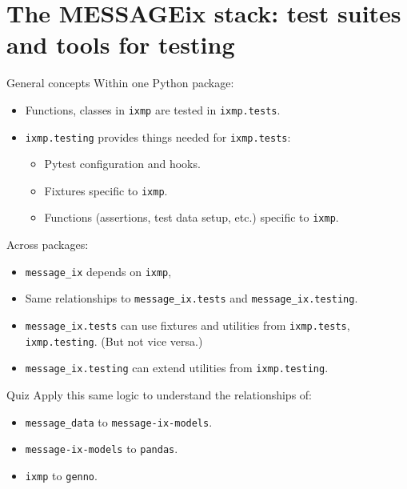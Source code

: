 \documentclass[12pt,aspectratio=169]{beamer}
\renewcommand{\mod}[1]{\texttt{#1}}
\begin{document}
\section{The MESSAGEix stack: test suites and tools for testing}
\begin{frame}[fragile]{General concepts}
Within one Python package:
\begin{itemize}
  \item Functions, classes in \mod{ixmp} are tested in \mod{ixmp.tests}.
  \item \mod{ixmp.testing} provides things needed for \mod{ixmp.tests}:
  \begin{itemize}
    \item Pytest configuration and hooks.
    \item Fixtures specific to \mod{ixmp}.
    \item Functions (assertions, test data setup, etc.) specific to \mod{ixmp}.
  \end{itemize}
\end{itemize}

\medskip
Across packages:
\begin{itemize}
  \item \mod{message_ix} depends on \mod{ixmp}, 
  \item Same relationships to \mod{message_ix.tests} and \mod{message_ix.testing}.
  \item \mod{message_ix.tests} can use fixtures and utilities from \mod{ixmp.tests}, \mod{ixmp.testing}. (But not vice versa.)
  \item \mod{message_ix.testing} can extend utilities from \mod{ixmp.testing}.
\end{itemize}
\end{frame}

\begin{frame}{Quiz}
Apply this same logic to understand the relationships of:

\begin{itemize}
  \item \mod{message_data} to \mod{message-ix-models}.
  \item \mod{message-ix-models} to \mod{pandas}.
  \item \mod{ixmp} to \mod{genno}.
\end{itemize}
\end{frame}
\end{document}
